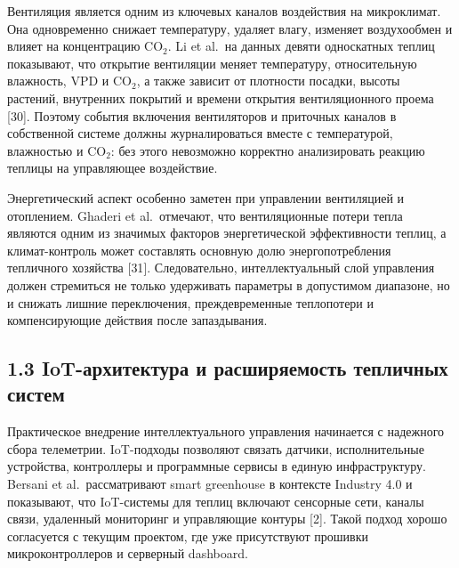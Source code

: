 \documentclass[a4paper,14pt]{extarticle}
\begin{document}
Вентиляция является одним из ключевых каналов воздействия на
микроклимат. Она одновременно снижает температуру, удаляет влагу,
изменяет воздухообмен и влияет на концентрацию CO\(_2\). Li et al.~на
данных девяти односкатных теплиц показывают, что открытие вентиляции
меняет температуру, относительную влажность, VPD и CO\(_2\), а также
зависит от плотности посадки, высоты растений, внутренних покрытий и
времени открытия вентиляционного проема {[}30{]}. Поэтому события
включения вентиляторов и приточных каналов в собственной системе должны
журналироваться вместе с температурой, влажностью и CO\(_2\): без этого
невозможно корректно анализировать реакцию теплицы на управляющее
воздействие.

Энергетический аспект особенно заметен при управлении вентиляцией и
отоплением. Ghaderi et al.~отмечают, что вентиляционные потери тепла
являются одним из значимых факторов энергетической эффективности теплиц,
а климат-контроль может составлять основную долю энергопотребления
тепличного хозяйства {[}31{]}. Следовательно, интеллектуальный слой
управления должен стремиться не только удерживать параметры в допустимом
диапазоне, но и снижать лишние переключения, преждевременные теплопотери
и компенсирующие действия после запаздывания.

\hypertarget{iot-ux430ux440ux445ux438ux442ux435ux43aux442ux443ux440ux430-ux438-ux440ux430ux441ux448ux438ux440ux44fux435ux43cux43eux441ux442ux44c-ux442ux435ux43fux43bux438ux447ux43dux44bux445-ux441ux438ux441ux442ux435ux43c}{%
\subsection{1.3 IoT-архитектура и расширяемость тепличных
систем}\label{iot-ux430ux440ux445ux438ux442ux435ux43aux442ux443ux440ux430-ux438-ux440ux430ux441ux448ux438ux440ux44fux435ux43cux43eux441ux442ux44c-ux442ux435ux43fux43bux438ux447ux43dux44bux445-ux441ux438ux441ux442ux435ux43c}}

Практическое внедрение интеллектуального управления начинается с
надежного сбора телеметрии. IoT-подходы позволяют связать датчики,
исполнительные устройства, контроллеры и программные сервисы в единую
инфраструктуру. Bersani et al.~рассматривают smart greenhouse в
контексте Industry 4.0 и показывают, что IoT-системы для теплиц включают
сенсорные сети, каналы связи, удаленный мониторинг и управляющие контуры
{[}2{]}. Такой подход хорошо согласуется с текущим проектом, где уже
присутствуют прошивки микроконтроллеров и серверный dashboard.
\end{document}
